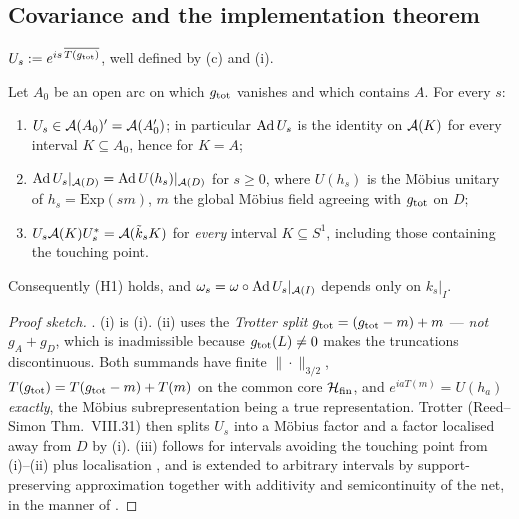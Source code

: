 \subsection{Covariance and the implementation theorem}

\begin{definition}\label{def:Us}
$U_{s}:=e^{is\,\overline{T(g_{\rm tot})}}$, well defined by (c) and (i).
\end{definition}

\begin{theorem}\label{thm:H1}
Let $A_{0}$ be an open arc on which $g_{\rm tot}$ vanishes and which contains $A$.  For every $s$:
\begin{enumerate}[label=\textup{(\roman*)},leftmargin=2.4em]
\item $U_{s}\in\mathcal A(A_{0})'=\mathcal A(A_{0}')$; in particular $\operatorname{Ad} U_{s}$ is the identity on $\mathcal A(K)$ for every
 interval $K\subseteq A_{0}$, hence for $K=A$;
\item $\operatorname{Ad} U_{s}|_{\mathcal A(D)}=\operatorname{Ad} U(h_{s})|_{\mathcal A(D)}$ for $s\ge0$, where $U(h_{s})$ is the M\"obius unitary of
 $h_{s}=\mathrm{Exp}(sm)$, $m$ the global M\"obius field agreeing with $g_{\rm tot}$ on $D$;
\item $U_{s}\mathcal A(K)U_{s}^{*}=\mathcal A(\tilde k_{s}K)$ for \emph{every} interval $K\subseteq S^{1}$, including
 those containing the touching point.
\end{enumerate}
Consequently \textup{(H1)} holds, and $\omega_{s}=\omega\circ\operatorname{Ad} U_{s}|_{\mathcal A(I)}$ depends only on
$k_{s}|_{I}$.
\end{theorem}

\begin{proof}[Proof sketch]
\cite[Thm.~4.7]{RigorC}.  (i) is (i).  (ii) uses the \emph{Trotter split}
$g_{\rm tot}=(g_{\rm tot}-m)+m$ --- \emph{not} $g_{A}+g_{D}$, which is inadmissible because
$g_{\rm tot}(L)\neq0$ makes the truncations discontinuous.  Both summands have finite $\|\cdot\|_{3/2}$,
$T(g_{\rm tot})=T(g_{\rm tot}-m)+T(m)$ on the common core $\mathcal H_{\rm fin}$, and
$e^{iaT(m)}=U(h_{a})$ \emph{exactly}, the M\"obius subrepresentation being a true representation.  Trotter
(Reed--Simon Thm.~VIII.31) then splits $U_{s}$ into a M\"obius factor and a factor localised away from $D$
by (i).  (iii) follows for intervals avoiding the touching point from (i)--(ii) plus
localisation \cite[Prop.~5.4]{CW}, and is extended to arbitrary intervals by support-preserving
approximation together with additivity and semicontinuity of the net, in the manner of
\cite[Prop.~4.1]{CDIT}.
\end{proof}

